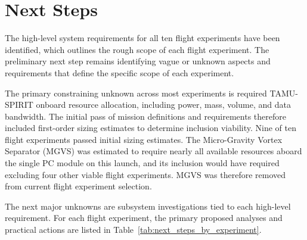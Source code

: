 \documentclass[conf]{new-aiaa}
\begin{document}
\clearpage
\section{Next Steps}

The high-level system requirements for all ten flight experiments have been identified, which outlines the rough scope of each flight experiment. The preliminary next step remains identifying vague or unknown aspects and requirements that define the specific scope of each experiment. \cite{tamu-spirit-rfp}

The primary constraining unknown across most experiments is required TAMU-SPIRIT onboard resource allocation, including power, mass, volume, and data bandwidth. The initial pass of mission definitions and requirements therefore included first-order sizing estimates to determine inclusion viability. Nine of ten flight experiments passed initial sizing estimates. The Micro-Gravity Vortex Separator (MGVS) was estimated to require nearly all available resources aboard the single PC module on this launch, and its inclusion would have required excluding four other viable flight experiments. MGVS was therefore removed from current flight experiment selection. \cite{tamuSpiritQRGv3_2025}

The next major unknowns are subsystem investigations tied to each high-level requirement. For each flight experiment, the primary proposed analyses and practical actions are listed in Table~\ref{tab:next_steps_by_experiment}.
\end{document}
